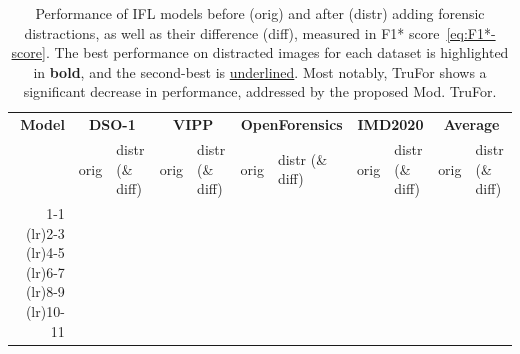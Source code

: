 
\begin{table}[tb]
    \centering
    \footnotesize
    \setlength{\tabcolsep}{5pt}
    
    \newcommand{\light}[1]{#1}
    \newcommand{\tr}[1]{%
        \pgfmathparse{#1}%
        \pgfmathprintnumberto[fixed, zerofill, precision=3, assume math mode=true]{\pgfmathresult}{\formatted}%
        \StrSubstitute[1]{\formatted}{0.}{.}[\formatted]%
        \formatted%
    }
    \newcommand{\trz}[1]{%
        \pgfmathparse{#1}%
        \pgfmathprintnumberto[fixed, zerofill, precision=3, assume math mode=true,, ]{\pgfmathresult}{\formatted}%
        \formatted%
    }
    \newcommand{\fn}{\hspace{-0.35em}\rlap{\textsuperscript{1}}}
    \newcommand{\fnn}{\rlap{\textsuperscript{1}}}
    

    \caption{
    Performance of IFL models before (orig) and after (distr) adding forensic distractions, as well as their difference (diff), measured in F1* score~\eqref{eq:F1*-score}. 
    The best performance on distracted images for each dataset is highlighted in \textbf{bold}, and the second-best is \underline{underlined}.
    Most notably, TruFor shows a significant decrease in performance, addressed by the proposed Mod. TruFor.
    }
    \label{table:motivation:results}
    

    \begin{tabular}{rllllllllll}
    
    \toprule
    \textbf{Model}      
    & \multicolumn{2}{c}{\textbf{DSO-1}}%
    & \multicolumn{2}{c}{\textbf{VIPP}}%
    & \multicolumn{2}{c}{\textbf{OpenForensics}}%
    & \multicolumn{2}{c}{\textbf{IMD2020 \fnn}}%
    & \multicolumn{2}{c}{\textbf{Average}} \\ 

    & orig & distr (\& diff)
     & orig & distr (\& diff)
     & orig & distr  (\& diff)
     & orig & distr (\& diff)
     & orig & distr (\& diff) \\

    \cmidrule(lr){1-1}
    \cmidrule(lr){2-3}
    \cmidrule(lr){4-5}
    \cmidrule(lr){6-7}
    \cmidrule(lr){8-9}
    \cmidrule(lr){10-11}


\end{tabular}
\end{table}
